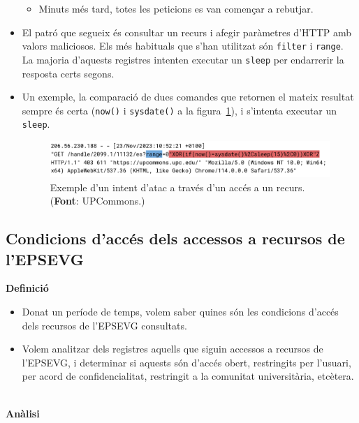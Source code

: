 \begin{itemize}
\begin{itemize}
        \item Minuts més tard, totes les peticions es van començar a rebutjar.
    \end{itemize}
    \item El patró que segueix és consultar un recurs i afegir paràmetres d'\gls{HTTP} amb valors maliciosos.
    Els més habituals que s'han utilitzat són \texttt{filter} i \texttt{range}.
    La majoria d'aquests registres intenten executar un \texttt{sleep} per endarrerir la resposta certs segons.
    \item Un exemple, la comparació de dues comandes que retornen el mateix resultat sempre és certa (\texttt{now()} i \texttt{sysdate()} a la figura~\ref{fig:log-attack-example}), i s'intenta executar un \texttt{sleep}. \\
    \begin{figure}[htbp]
        \centerline{\includegraphics[width=\textwidth]{figures/log-attack}}
        \captionsetup{justification=centering}
        \caption[Exemple d'un intent d'atac a través d'un accés a un recurs.]{Exemple d'un intent d'atac a través d'un accés a un recurs. (\textbf{Font}: UPCommons.)}\label{fig:log-attack-example}
    \end{figure}
\end{itemize}

\clearpage

\subsection{Condicions d'accés dels accessos a recursos de l'EPSEVG}\label{subsec:acces-conditions}

\textbf{Definició}

\begin{itemize}
    \item Donat un període de temps, volem saber quines són les condicions d'accés dels recursos de l'EPSEVG consultats.
    \item Volem analitzar dels registres aquells que siguin accessos a recursos de l'EPSEVG, i determinar si aquests són d'accés obert, restringits per l'usuari, per acord de confidencialitat, restringit a la comunitat universitària, etcètera.
\end{itemize}

\noindent \\
\textbf{Anàlisi}

